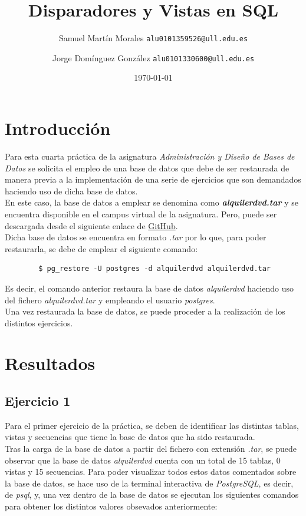 \documentclass[11pt]{report}
\begin{document}
	
	
	\title{Disparadores y Vistas en SQL}
	\author{Samuel Martín Morales \texttt{alu0101359526@ull.edu.es} \and Jorge Domínguez González \texttt{alu0101330600@ull.edu.es}}
	\date{\today}
	
	\maketitle
	
	\tableofcontents
	
	\chapter{Introducción}
  Para esta cuarta práctica de la asignatura \emph{Administración y Diseño de Bases de Datos} se solicita el empleo de una base de datos que debe de ser restaurada de manera previa a la implementación de una serie de ejercicios que son demandados haciendo uso de dicha base de datos.
\\
	En este caso, la base de datos a emplear se denomina como \emph{\textbf{alquilerdvd.tar}} y se encuentra disponible en el campus virtual de la asignatura. Pero, puede ser descargada desde el siguiente enlace de \href{https://github.com/Samuelmm15/PostgreSQL-Rent/blob/main/AlquilerPractica.tar}{GitHub}.
\\
	Dicha base de datos se encuentra en formato \emph{.tar} por lo que, para poder restaurarla, se debe de emplear el siguiente comando:

	\begin{verbatim}
		$ pg_restore -U postgres -d alquilerdvd alquilerdvd.tar
	\end{verbatim}

	Es decir, el comando anterior restaura la base de datos \emph{alquilerdvd} haciendo uso del fichero \emph{alquilerdvd.tar} y empleando el usuario \emph{postgres}.
\\
	Una vez restaurada la base de datos, se puede proceder a la realización de los distintos ejercicios.
\\
	\chapter{Resultados}
	\section{Ejercicio 1}
	Para el primer ejercicio de la práctica, se deben de identificar las distintas tablas, vistas y secuencias que tiene la base de datos que ha sido restaurada.
\\
	Tras la carga de la base de datos a partir del fichero con extensión \emph{.tar}, se puede observar que la base de datos \emph{alquilerdvd} cuenta con un total de 15 tablas, 0 vistas y 15 secuencias. Para poder visualizar todos estos datos comentados sobre la base de datos, se hace uso de la terminal interactiva de \emph{PostgreSQL}, es decir, de \emph{psql}, y, una vez dentro de la base de datos se ejecutan los siguientes comandos para obtener los distintos valores obsevados anteriormente:
\end{document}
